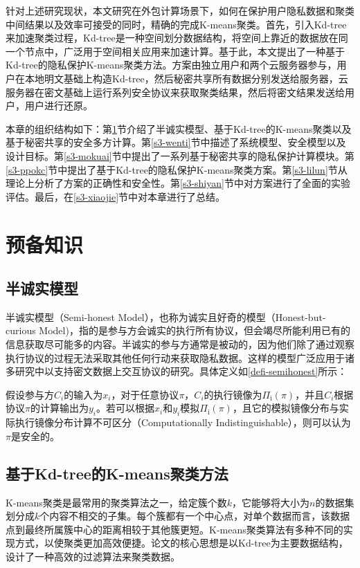 针对上述研究现状，本文研究在外包计算场景下，如何在保护用户隐私数据和聚类中间结果以及效率可接受的同时，精确的完成K-means聚类。首先，引入Kd-tree来加速聚类过程，Kd-tree是一种空间划分数据结构，将空间上靠近的数据放在同一个节点中，广泛用于空间相关应用来加速计算。基于此，本文提出了一种基于Kd-tree的隐私保护K-means聚类方法。方案由独立用户和两个云服务器参与，用户在本地明文基础上构造Kd-tree，然后秘密共享所有数据分别发送给服务器，云服务器在密文基础上运行系列安全协议来获取聚类结果，然后将密文结果发送给用户，用户进行还原。

本章的组织结构如下：第\ref{s3-yubei}节介绍了半诚实模型、基于Kd-tree的K-means聚类以及基于秘密共享的安全多方计算。第\ref{s3-wenti}节中描述了系统模型、安全模型以及设计目标。第\ref{s3-mokuai}节中提出了一系列基于秘密共享的隐私保护计算模块。第\ref{s3-ppokc}节中提出了基于Kd-tree的隐私保护K-means聚类方案。第\ref{s3-lilun}节从理论上分析了方案的正确性和安全性。第\ref{s3-shiyan}节中对方案进行了全面的实验评估。最后，在\ref{s3-xiaojie}节中对本章进行了总结。
\section{预备知识}
\label{s3-yubei}
\subsection{半诚实模型}
\label{s3-anquanmoxing}
半诚实模型（Semi-honest Model），也称为诚实且好奇的模型（Honest-but-curious Model)，指的是参与方会诚实的执行所有协议，但会竭尽所能利用已有的信息获取尽可能多的内容。半诚实的参与方通常是被动的，因为他们除了通过观察执行协议的过程无法采取其他任何行动来获取隐私数据。这样的模型广泛应用于诸多研究中以支持密文数据上交互协议的研究。具体定义如\ref{defi-semihonest}所示\cite{oded2009foundations}：

\begin{definition}
	\label{defi-semihonest}
	假设参与方$ C_i $的输入为$ x_i $，对于任意协议$ \pi $，$ C_i $的执行镜像为$\Pi_{\mathrm{i}}(\pi)$，并且$ C_i $根据协议$ \pi $的计算输出为$ y_i$。若可以根据$ x_i $和$ y_i $模拟$\Pi_{\mathrm{i}}(\pi)$，且它的模拟镜像分布与实际执行镜像分布计算不可区分（Computationally Indistinguishable），则可以认为$ \pi $是安全的。
\end{definition}

\subsection{基于Kd-tree的K-means聚类方法}
K-means聚类是最常用的聚类算法之一，给定簇个数$ k $，它能够将大小为$ n $的数据集划分成$ k $个内容不相交的子集。每个簇都有一个中心点，对单个数据而言，该数据点到最终所属簇中心的距离相较于其他簇更短。K-means聚类算法有多种不同的实现方式，以使聚类更加高效便捷。论文\cite{kanungo2002efficient}的核心思想是以Kd-tree为主要数据结构，设计了一种高效的过滤算法来聚类数据。

